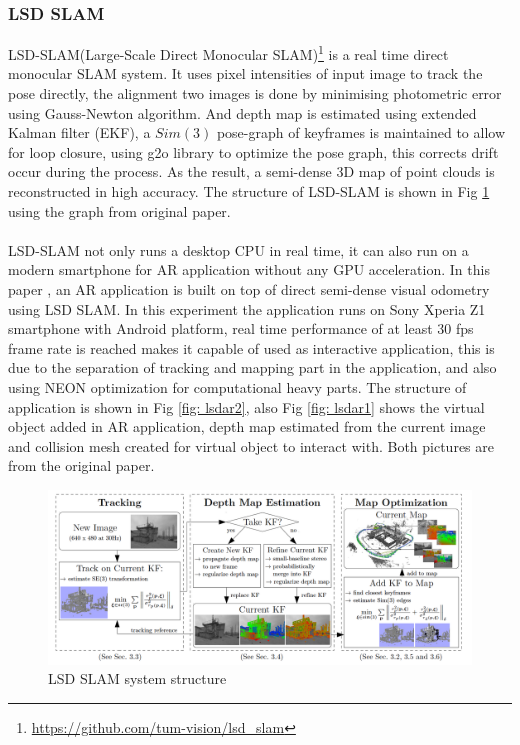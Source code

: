 \documentclass[12pt,twoside]{article}
\begin{document}
\subsubsection{LSD SLAM}
LSD-SLAM(Large-Scale Direct Monocular SLAM)\citep{engel2014lsd}\footnote{\url{https://github.com/tum-vision/lsd_slam}} is a real time direct monocular SLAM system. It uses pixel intensities of input image to track the pose directly, the alignment two images is done by minimising photometric error using Gauss-Newton algorithm. And depth map is estimated using extended Kalman filter (EKF), a $Sim(3)$ pose-graph of keyframes is maintained to allow for loop closure, using g2o library to optimize the pose graph, this corrects drift occur during the process. As the result, a semi-dense 3D map of point clouds is reconstructed in high accuracy. The structure of LSD-SLAM is shown in Fig \ref{fig: lsdslam1} using the graph from original paper.\\
\\
LSD-SLAM not only runs a desktop CPU in real time, it can also run on a modern smartphone for AR application without any GPU acceleration. In this paper \citep{schops2014semi}, an AR application is built on top of direct semi-dense visual odometry using LSD SLAM. In this experiment the application runs on Sony Xperia Z1 smartphone with Android platform, real time performance of at least 30 fps frame rate is reached makes it  capable of used as interactive application, this is due to the separation of tracking and mapping part in the application, and also using NEON optimization for computational heavy parts. The structure of application is shown in Fig \ref{fig: lsdar2}, also Fig \ref{fig: lsdar1} shows the virtual object added in AR application, depth map estimated from the current image and collision mesh created for virtual object to interact with. Both pictures are from the original paper.

\begin{figure}[h]
    \centering
    \includegraphics[width=1.0\textwidth]{figures/lsdslam1}
    \caption{LSD SLAM system structure}
    \label{fig: lsdslam1}
\end{figure}
\end{document}
